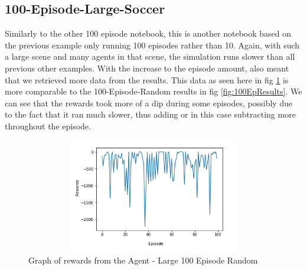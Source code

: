 \begin{itemize}
\subsection{100-Episode-Large-Soccer}
Similarly to the other 100 episode notebook, this is another notebook based on the previous example only running 100 episodes rather than 10. Again, with such a large scene and many agents in that scene, the simulation runs slower than all previous other examples. With the increase to the episode amount, also meant that we retrieved more data from the results. This data as seen here in fig \ref{fig:100EpLarge} is more comparable to the 100-Episode-Random results in fig \ref{fig:100EpResults}. We can see that the rewards took more of a dip during some episodes, possibly due to the fact that it ran much slower, thus adding or in this case subtracting more throughout the episode.


\begin{figure}[H]
    \centering
    \includegraphics[width=120mm, height=50mm]{img/random100results.PNG}
    \caption{Graph of rewards from the Agent - Large 100 Episode Random}
    \label{fig:100EpLarge}
\end{figure}

\end{itemize}